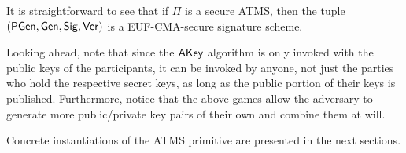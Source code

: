 It is straightforward to see that if
$\Pi$
is a secure ATMS, then
the tuple $( \textsf{PGen},\allowbreak \mathsf{Gen},\allowbreak \mathsf{Sig},\allowbreak \mathsf{Ver} )$ is a \textsf{EUF-CMA}-secure
signature scheme.

Looking ahead, note that since the $\textsf{AKey}$ algorithm is only invoked with
the public keys of the participants, it can be invoked by anyone, not just the
parties who hold the respective secret keys, as long as the public portion of
their keys is published. Furthermore, notice that the above games allow the adversary
to generate more public/private key pairs of their own and combine them at will.

Concrete instantiations of the ATMS primitive are
presented in the next sections.
